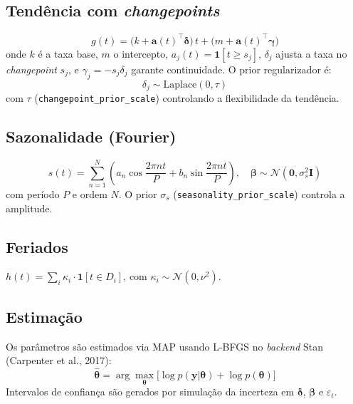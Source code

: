 \documentclass[12pt, a4paper]{article}
\begin{document}
\subsection{Tendência com \textit{changepoints}}

\begin{equation}
    g(t) = \big(k + \mathbf{a}(t)^\top\boldsymbol{\delta}\big)\,t
    + \big(m + \mathbf{a}(t)^\top\boldsymbol{\gamma}\big)
    \label{eq:trend}
\end{equation}
onde $k$ é a taxa base, $m$ o intercepto,
$a_j(t) = \mathbf{1}[t \geq s_j]$, $\delta_j$ ajusta a taxa
no \textit{changepoint} $s_j$, e $\gamma_j = -s_j\delta_j$
garante continuidade. O prior regularizador é:
\begin{equation}
    \delta_j \sim \text{Laplace}(0, \tau)
\end{equation}
com $\tau$ (\texttt{changepoint\_prior\_scale}) controlando a
flexibilidade da tendência.

\subsection{Sazonalidade (Fourier)}

\begin{equation}
    s(t) = \sum_{n=1}^{N}\!\left(
    a_n\cos\!\frac{2\pi nt}{P} + b_n\sin\!\frac{2\pi nt}{P}
    \right), \quad
    \boldsymbol{\beta} \sim \mathcal{N}(\mathbf{0}, \sigma_s^2\mathbf{I})
    \label{eq:fourier}
\end{equation}
com período $P$ e ordem $N$. O prior $\sigma_s$
(\texttt{seasonality\_prior\_scale}) controla a amplitude.

\subsection{Feriados}

$h(t) = \sum_i \kappa_i \cdot \mathbf{1}[t \in D_i]$,
com $\kappa_i \sim \mathcal{N}(0, \nu^2)$.

\subsection{Estimação}

Os parâmetros são estimados via MAP usando L-BFGS no
\textit{backend} Stan (Carpenter et al., 2017):
\begin{equation}
    \hat{\boldsymbol{\theta}} = \arg\max_{\boldsymbol{\theta}}
    \big[\log p(\mathbf{y}|\boldsymbol{\theta}) +
    \log p(\boldsymbol{\theta})\big]
\end{equation}
Intervalos de confiança são gerados por simulação da incerteza
em $\boldsymbol{\delta}$, $\boldsymbol{\beta}$ e $\varepsilon_t$.
\end{document}
